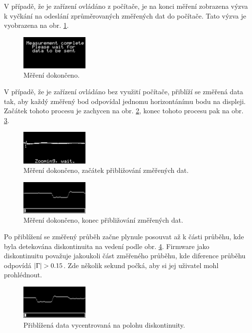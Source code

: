 V případě, že je zařízení ovládáno z počítače, je na konci měření zobrazena výzva k vyčkání na odeslání zprůměrovaných změřených dat do počítače. Tato výzva je vyobrazena na obr. \ref{measurement_complete}.
\begin{figure}[H]
\includegraphics[width=0.3\textwidth,keepaspectratio,interpolate=false]{images/measurement_complete.png}\caption{Měření dokončeno.}\label{measurement_complete}
\end{figure}

V případě, že je zařízení ovládáno bez využití počítače, přiblíží se změřená data tak, aby každý změřený bod odpovídal jednomu horizontánímu bodu na displeji. Začátek tohoto procesu je zachycen na obr. \ref{zooming_start}, konec tohoto procesu pak na obr. \ref{zooming_complete}.
\begin{figure}[H]
\includegraphics[width=0.3\textwidth,keepaspectratio,interpolate=false]{images/zooming_start.png}\caption{Měření dokončeno, začátek přibližování změřených dat.}\label{zooming_start}
\end{figure}

\begin{figure}[H]
\includegraphics[width=0.3\textwidth,keepaspectratio,interpolate=false]{images/zooming_complete.png}\caption{Měření dokončeno, konec přibližování změřených dat.}\label{zooming_complete}
\end{figure}

Po přiblížení se změřený průběh začne plynule posouvat až k části průběhu, kde byla detekována diskontinuita na vedení podle obr. \ref{discontinuity_open_after_split}. Firmware jako diskontinuitu považuje jakoukoli část změřeného průběhu, kde diference průběhu odpovídá $\abs{\Gamma}>\SI{0.15}{}$. Zde několik sekund počká, aby si jej uživatel mohl prohlédnout. 
\begin{figure}[H]
\includegraphics[width=0.3\textwidth,keepaspectratio,interpolate=false]{images/discontinuity_open_after_split.png}\caption{Přiblížená data vycentrovaná na polohu diskontinuity.}\label{discontinuity_open_after_split}
\end{figure}

